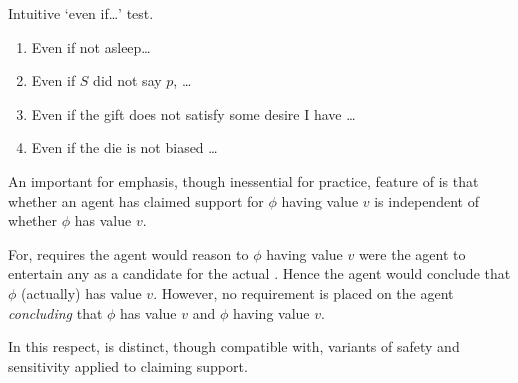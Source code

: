 \begin{note}
  \color{red}
  Intuitive `even if\dots' test.

  \begin{enumerate}[label=\ref{fig:ideaCSA:basic-examples}\alph*., ref=(\ref{fig:ideaCSA:basic-examples}\alph*)]
  \item Even if not asleep\dots
  \item Even if \(S\) did not say \(p\), \dots
  \item Even if the gift does not satisfy some desire I have \dots
  \item Even if the die is not biased \dots
  \end{enumerate}
\end{note}

\begin{note}
  An important for emphasis, though inessential for practice, feature of \ideaCSA{} is that whether an agent has claimed support for \(\phi\) having value \(v\) is independent of whether \(\phi\) has value \(v\).

  For, \ideaCSA{} requires the agent would reason to \(\phi\) having value \(v\) were the agent to entertain any \epN{} \world{} as a candidate for the actual \world{}.
  Hence the agent would conclude that \(\phi\) (actually) has value \(v\).
  However, no requirement is placed on the agent \emph{concluding} that \(\phi\) has value \(v\) and \(\phi\) having value \(v\).

  In this respect, \ideaCSA{} is distinct, though compatible with, variants of safety and sensitivity applied to claiming support.
\end{note}

